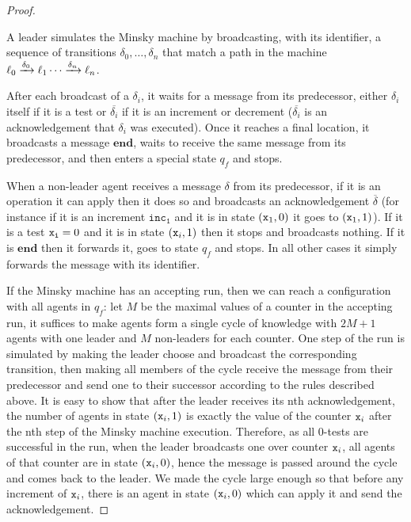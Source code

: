 \begin{proof}
\begin{itemize}
		A leader simulates the Minsky machine by broadcasting,  with its identifier, a sequence of transitions $\delta_0, \ldots, \delta_n$ that match a path in the machine $\ell_0 \xrightarrow{\delta_0} \ell_1  \cdots \xrightarrow{\delta_n} \ell_n$. 
		
		After each broadcast of a $\delta_i$, it waits for a message from its predecessor, either $\delta_i$ itself if it is a test or $\overline{\delta_i}$ if it is an increment or decrement ($\overline{\delta_i}$ is an acknowledgement  that $\delta_i$ was executed).
		Once it reaches a final location, it broadcasts a message  $\mathbf{end}$, waits to receive the same message from its predecessor, and then enters a special state $q_f$ and stops.
		
		When a non-leader agent receives a message $\delta$ from its predecessor, if it is an operation it can apply then it does so and broadcasts an acknowledgement $\overline{\delta}$ (for instance if it is an increment $\mathtt{inc_1}$ and it is in state $(\mathtt{x}_1, 0)$ it goes to $(\mathtt{x}_1, 1)$). 
		If it is a test $\mathtt{\mathtt{x}_i}=0$ and it is in state $(\mathtt{x}_i, 1)$ then it stops and broadcasts nothing.
		If it is $\mathbf{end}$ then it forwards it, goes to state $q_f$ and stops.
		In all other cases it simply forwards the message with its identifier.
	\end{itemize}

If the Minsky machine has an accepting run, then we can reach a configuration with all agents in $q_f$: let $M$ be the maximal values of a counter in the accepting run, it suffices to make agents form a single cycle of knowledge with $2M+1$ agents with one leader and $M$ non-leaders for each counter.
One step of the run is simulated by making the leader choose and broadcast the corresponding transition, then making all members of the cycle receive the message from their predecessor and send one to their successor according to the rules described above. It is easy to show that after the leader receives its nth acknowledgement, the number of agents in state $(\mathtt{x}_i, 1)$ is exactly the value of the counter $\mathtt{x}_i$ after the nth step of the Minsky machine execution.
Therefore, as all 0-tests are successful in the run, when the leader broadcasts one over counter $\mathtt{x}_i$, all agents of that counter are in state $(\mathtt{x}_i, 0)$, hence the message is passed around the cycle and comes back to the leader.
We made the cycle large enough so that before any increment of $\mathtt{x}_i$, there is an agent in state $(\mathtt{x}_i, 0)$ which can apply it and send the acknowledgement.


\end{proof}

